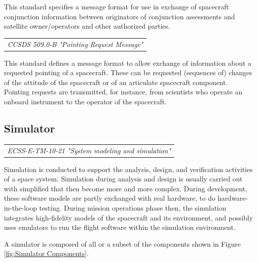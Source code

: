 This standard specifies a message format for use in exchange of spacecraft conjunction information between originators of conjunction assessments and satellite owner/operators and other authorized parties. 

\begin{tabular}{l}
\textit{CCSDS 509.0-B "Pointing Request Message" \cite{CCSDS 509.0-B}} \\
\end{tabular}

This standard defines a message format to allow exchange of information about a requested pointing of a spacecraft. These can be requested (sequences of) changes of the attitude of the spacecraft or of an articulate spacecraft component. Pointing requests are transmitted, for instance, from scientists who operate an onboard instrument to the operator of the  spacecraft.
  
\subsection{Simulator}

\begin{tabular}{l}
\textit{ECSS-E-TM-10-21 "System modeling and simulation" \cite{ECSS-E-TM-10-21}} \\
\end{tabular}

Simulation is conducted to support the analysis, design, and verification activities of a space system. Simulation during analysis and design is usually carried out with simplified that then become more and more complex. During development, these software models are partly exchanged with real hardware, to do hardware-in-the-loop testing. During mission operations phase then, the simulation integrates high-fidelity models of the spacecraft and its environment, and possibly uses emulators to run the flight software within the simulation environment.

A simulator is composed of all or a subset of the components shown in Figure \ref{fig:Simulator Components}.

